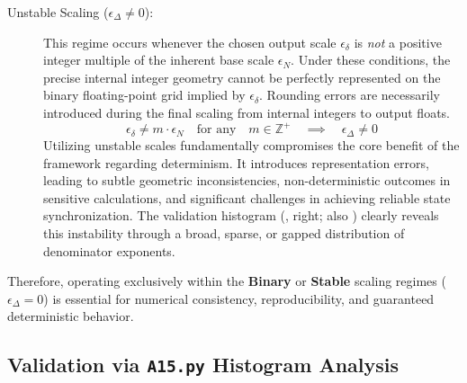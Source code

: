 \documentclass[10pt]{article}
\begin{document}
\begin{description}
    \item[Unstable Scaling ($\epsilon_\Delta \neq 0$):] This regime occurs whenever the chosen output scale $\epsilon_\delta$ is \emph{not} a positive integer multiple of the inherent base scale $\epsilon_N$. Under these conditions, the precise internal integer geometry cannot be perfectly represented on the binary floating-point grid implied by $\epsilon_\delta$. Rounding errors are necessarily introduced during the final scaling from internal integers to output floats.
    \begin{equation}\label{eq-scaling-unstable}
    \epsilon_\delta \neq m \cdot \epsilon_N \quad \text{for any} \quad m \in \mathbb{Z}^+ \quad \implies \quad \epsilon_\Delta \neq 0
    \end{equation}
    Utilizing unstable scales fundamentally compromises the core benefit of the framework regarding determinism. It introduces representation errors, leading to subtle geometric inconsistencies, non-deterministic outcomes in sensitive calculations, and significant challenges in achieving reliable state synchronization. The validation histogram (, right; also ) clearly reveals this instability through a broad, sparse, or gapped distribution of denominator exponents.
\end{description}
Therefore, operating exclusively within the \textbf{Binary} or \textbf{Stable} scaling regimes ($\epsilon_\Delta = 0$) is essential for numerical consistency, reproducibility, and guaranteed deterministic behavior.

\subsection{Validation via \texttt{A15.py} Histogram Analysis}\label{subsec-stability-validation}
\end{document}
